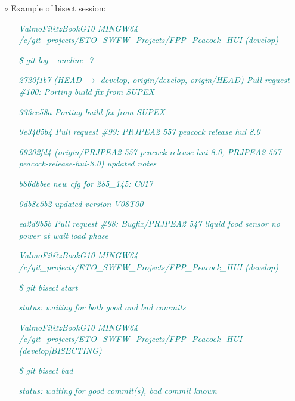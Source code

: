 \documentclass[a4paper,portrait,10pt]{article}   %
\newcommand{\mybulletlvA}{$\circ$}   %
\newcommand{\mytextfilecolor}{teal}   %
\newcommand{\myexfont}{\small}   %
\begin{document}
\begin{itemize}
\item[\mybulletlvA] Example of bisect session:

\begin{itemize}
  \item[] \textcolor{\mytextfilecolor}{\textit{\myexfont ValmoFil@zBookG10 MINGW64 /c/git\_projects/ETO\_SWFW\_Projects/FPP\_Peacock\_HUI (develop)}}
  \item[] \textcolor{\mytextfilecolor}{\textit{\myexfont \$ git log -{}-oneline -7}}
  \item[] \textcolor{\mytextfilecolor}{\textit{\myexfont 2720f1b7 (HEAD $\rightarrow$ develop, origin/develop, origin/HEAD) Pull request \#100: Porting build fix from SUPEX}}
  \item[] \textcolor{\mytextfilecolor}{\textit{\myexfont 333ce58a Porting build fix from SUPEX}}
  \item[] \textcolor{\mytextfilecolor}{\textit{\myexfont 9e3405b4 Pull request \#99: PRJPEA2 557 peacock release hui 8.0}}
  \item[] \textcolor{\mytextfilecolor}{\textit{\myexfont 69202fd4 (origin/PRJPEA2-557-peacock-release-hui-8.0, PRJPEA2-557-peacock-release-hui-8.0) updated notes}}
  \item[] \textcolor{\mytextfilecolor}{\textit{\myexfont b86dbbee new cfg for 285\_145: C017}}
  \item[] \textcolor{\mytextfilecolor}{\textit{\myexfont 0db8e5b2 updated version V08T00}}
  \item[] \textcolor{\mytextfilecolor}{\textit{\myexfont ea2d9b5b Pull request \#98: Bugfix/PRJPEA2 547 liquid food sensor no power at wait load phase}}
  \item[]
  \item[] \textcolor{\mytextfilecolor}{\textit{\myexfont ValmoFil@zBookG10 MINGW64 /c/git\_projects/ETO\_SWFW\_Projects/FPP\_Peacock\_HUI (develop)}}
  \item[] \textcolor{\mytextfilecolor}{\textit{\myexfont \$ git bisect start}}
  \item[] \textcolor{\mytextfilecolor}{\textit{\myexfont status: waiting for both good and bad commits}}
  \item[]
  \item[] \textcolor{\mytextfilecolor}{\textit{\myexfont ValmoFil@zBookG10 MINGW64 /c/git\_projects/ETO\_SWFW\_Projects/FPP\_Peacock\_HUI (develop|BISECTING)}}
  \item[] \textcolor{\mytextfilecolor}{\textit{\myexfont \$ git bisect bad}}
  \item[] \textcolor{\mytextfilecolor}{\textit{\myexfont status: waiting for good commit(s), bad commit known}}

\end{itemize}
\end{itemize}
\end{document}
